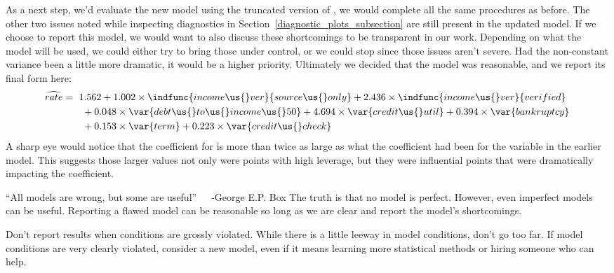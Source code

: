 As a next step, we'd evaluate the new model using
the truncated version of ,
we would complete all the same procedures as before.
The other two issues noted while inspecting diagnostics
in Section~\ref{diagnostic_plots_subsection} are still
present in the updated model.
If we choose to report this model, we would want to also
discuss these shortcomings to be transparent in our work.
Depending on what the model will be used, we could either
try to bring those under control, or we could stop since
those issues aren't severe.
Had the non-constant variance been a little more dramatic,
it would be a higher priority.
Ultimately we decided that the model was reasonable,
and we report its final form here:
\begin{align*}
\widehat{rate} &= \ 1.562
    + 1.002 \times \indfunc{income\us{}ver}{source\us{}only}
    + 2.436 \times \indfunc{income\us{}ver}{verified} \\
  &\qquad
    + 0.048 \times \var{debt\us{}to\us{}income\us{}50}
    + 4.694 \times \var{credit\us{}util}
    + 0.394 \times \var{bankruptcy} \\
  &\qquad
    + 0.153 \times \var{term}
    + 0.223 \times \var{credit\us{}check}
\end{align*}
A sharp eye would notice that the coefficient for
 is more than twice
as large as what the coefficient had been for the
 variable in the earlier model.
This suggests those larger values not only were points
with high leverage, but they were influential points that
were dramatically impacting the coefficient.

\begin{onebox}{``All models are wrong,
    but some are useful''~~~-George E.P. Box}
  The truth is that no model is perfect.
  However, even imperfect models can be useful.
  Reporting a flawed model can be reasonable so long
  as we are clear and report the model's shortcomings.
\end{onebox}

Don't report results when conditions are grossly violated.
While there is a little leeway in model conditions,
don't go too far.
If model conditions are very clearly violated,
consider a new model, even if it means learning more
statistical methods or hiring someone who can help.



